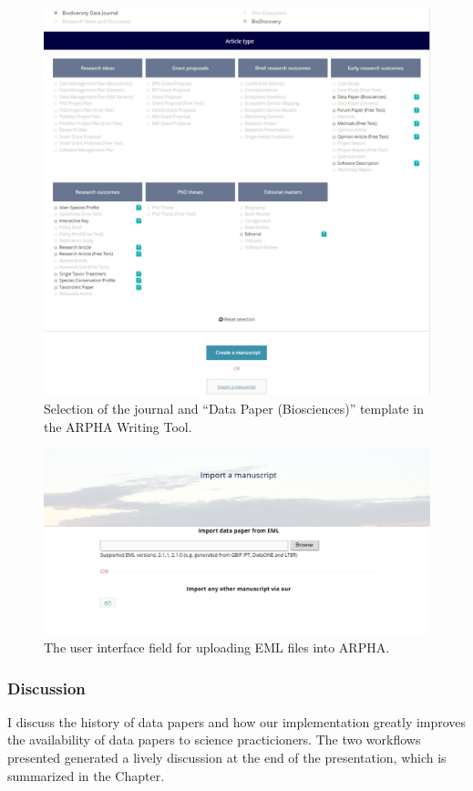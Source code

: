 \begin{figure}
\centering
\includegraphics[width=\textwidth]{Figures/journal-selection}
\decoRule
\caption{Selection of the journal and ``Data Paper (Biosciences)'' template in the ARPHA Writing Tool.}
\label{fig:journal-selection}
\end{figure}

\begin{figure}
\centering
\includegraphics[width=\textwidth]{Figures/user-interface}
\decoRule
\caption{The user interface field for uploading EML files into ARPHA.}
\label{fig:user-interface}
\end{figure}

\subsubsection{Discussion}

I discuss the history of data papers and how our implementation greatly improves the availability of data papers to science practicioners. The two workflows presented generated a lively discussion at the end of the presentation, which is summarized in the Chapter.